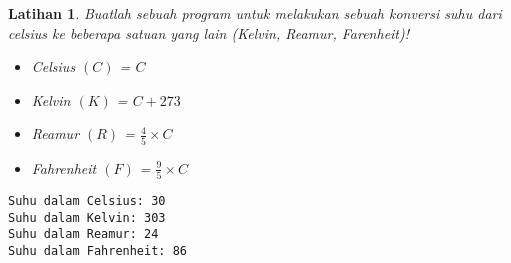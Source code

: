 \documentclass[aspectratio=169]{beamer}
\newtheorem{latihan}{Latihan}
\theoremstyle{definition}
\begin{document}
    \begin{frame}[fragile]
        \begin{latihan}
            Buatlah sebuah program untuk melakukan sebuah konversi suhu dari celsius ke beberapa satuan yang lain (Kelvin, Reamur, Farenheit)!
            \begin{itemize}[label=$\bullet$]
                \item Celsius $(C)$ = $C$
                \item Kelvin $(K)$ = $C + 273$
                \item Reamur $(R)$ = $\displaystyle \frac{4}{5}\times C$
                \item Fahrenheit $(F)$ = $\displaystyle \frac{9}{5}\times C$
            \end{itemize}
        \end{latihan}
        \begin{lstlisting}[style=output,numbers=none]
Suhu dalam Celsius: 30
Suhu dalam Kelvin: 303
Suhu dalam Reamur: 24
Suhu dalam Fahrenheit: 86
        \end{lstlisting}
    \end{frame}
\end{document}
